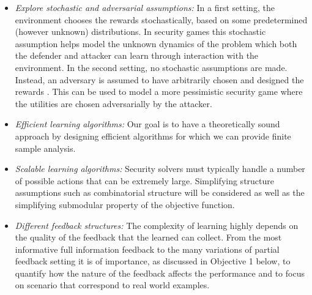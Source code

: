 \begin{itemize}
\item \textit{Explore stochastic and adversarial assumptions:} In a first setting, the environment chooses the rewards stochastically, based on some predetermined (however unknown) distributions. In security games this stochastic assumption helps model the unknown dynamics of the problem which both the defender and attacker can learn through interaction with the environment. In the second setting, no stochastic assumptions are made. Instead, an adversary is assumed to have arbitrarily chosen and designed the rewards
\cite{Auer03NS}. This can be used to model a more pessimistic security game where the utilities are chosen adversarially by the attacker.
\item \textit{Efficient learning algorithms:} 
Our goal is to have a theoretically sound approach by designing efficient algorithms for which we can provide finite sample analysis. %

\item \textit{Scalable learning algorithms:} Security solvers must typically handle a number of possible actions that can be extremely large.
Simplifying structure assumptions such as combinatorial structure will be considered as well as the simplifying submodular property of the objective function.

\item \textit{Different feedback structures:} The complexity of learning highly depends on the quality of the feedback that the learned can collect. From the most informative full information feedback to the many variations of partial feedback setting it is of importance, as discussed in Objective 1 below, to quantify how the nature of the feedback  affects the performance and to focus on scenario that correspond to real world examples.


\end{itemize}
